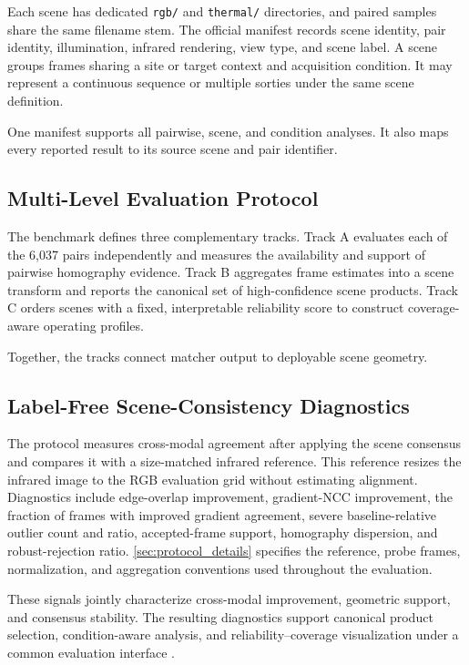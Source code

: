 Each scene has dedicated \texttt{rgb/} and \texttt{thermal/} directories, and paired samples share
the same filename stem. The official manifest records scene identity, pair identity, illumination,
infrared rendering, view type, and scene label. A scene groups frames sharing a site or target
context and acquisition condition. It may represent a continuous sequence or multiple sorties
under the same scene definition.

One manifest supports all pairwise, scene, and condition analyses. It also maps every reported
result to its source scene and pair identifier.

\subsection{Multi-Level Evaluation Protocol}

The benchmark defines three complementary tracks. Track A evaluates each of the 6,037 pairs
independently and measures the availability and support of pairwise homography evidence. Track B
aggregates frame estimates into a scene transform and reports the canonical set of high-confidence
scene products. Track C orders scenes with a fixed, interpretable reliability score to construct
coverage-aware operating profiles.

Together, the tracks connect matcher output to deployable scene geometry.

\subsection{Label-Free Scene-Consistency Diagnostics}

The protocol measures cross-modal agreement after applying the scene consensus and compares it
with a size-matched infrared reference. This reference resizes the infrared image to the RGB
evaluation grid without estimating alignment. Diagnostics include edge-overlap improvement, gradient-NCC improvement, the
fraction of frames with improved gradient agreement, severe baseline-relative outlier count and
ratio, accepted-frame support, homography dispersion, and robust-rejection ratio.
\ref{sec:protocol_details} specifies the reference, probe frames, normalization, and
aggregation conventions used throughout the evaluation.

These signals jointly characterize cross-modal improvement, geometric support, and consensus
stability. The resulting diagnostics support canonical product selection, condition-aware analysis,
and reliability--coverage visualization under a common evaluation interface
\cite{ma2021survey,liao2024survey}.
